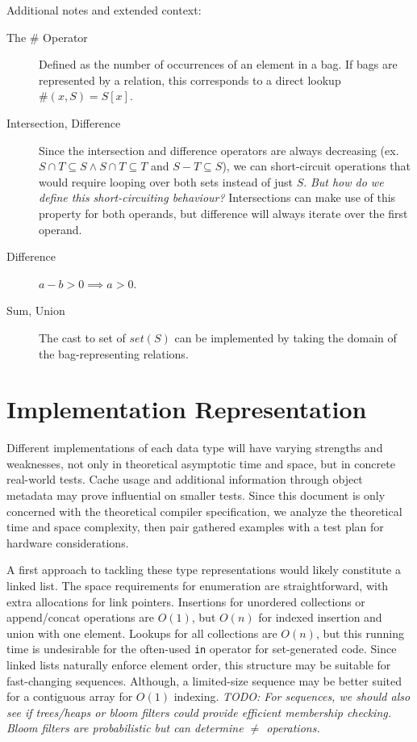 \documentclass{article}
\begin{document}
Additional notes and extended context:
\begin{description}
  \item[The $\#$ Operator] Defined as the number of occurrences of an element in a bag. If bags are represented by a relation, this corresponds to a direct lookup $\#(x, S) = S[x]$.
  \item[Intersection, Difference] Since the intersection and difference operators are always decreasing (ex. $S \cap T \subseteq S \land S \cap T \subseteq T$ and $S - T \subseteq S$), we can short-circuit operations that would require looping over both sets instead of just $S$. \textit{But how do we define this short-circuiting behaviour?} Intersections can make use of this property for both operands, but difference will always iterate over the first operand.
  \item[Difference] $a-b > 0 \implies a > 0$.
  \item[Sum, Union] The cast to set of $set(S)$ can be implemented by taking the domain of the bag-representing relations.
\end{description}

\section{Implementation Representation}
Different implementations of each data type will have varying strengths and weaknesses, not only in theoretical asymptotic time and space, but in concrete real-world tests. Cache usage and additional information through object metadata may prove influential on smaller tests. Since this document is only concerned with the theoretical compiler specification, we analyze the theoretical time and space complexity, then pair gathered examples with a test plan for hardware considerations.

A first approach to tackling these type representations would likely constitute a linked list. The space requirements for enumeration are straightforward, with extra allocations for link pointers. Insertions for unordered collections or append/concat operations are $O(1)$, but $O(n)$ for indexed insertion and union with one element. Lookups for all collections are $O(n)$, but this running time is undesirable for the often-used \texttt{in} operator for set-generated code. Since linked lists naturally enforce element order, this structure may be suitable for fast-changing sequences. Although, a limited-size sequence may be better suited for a contiguous array for $O(1)$ indexing. \textit{TODO: For sequences, we should also see if trees/heaps or bloom filters could provide efficient membership checking. Bloom filters are probabilistic but can determine $\neq$ operations.}
\end{document}
